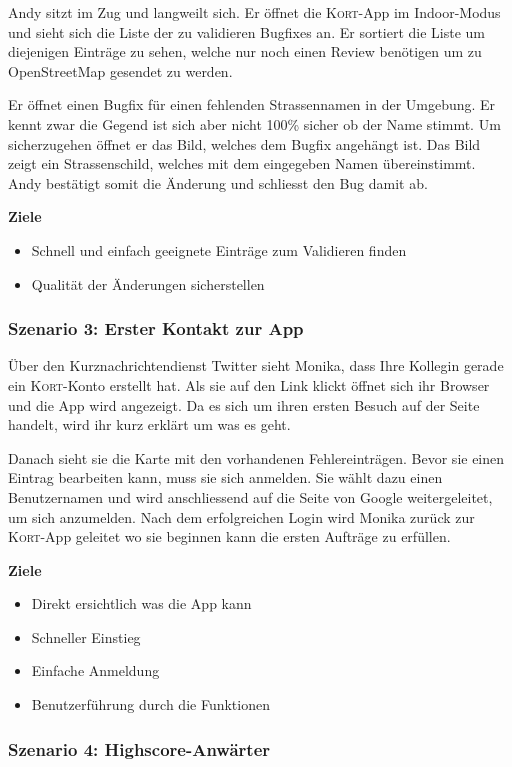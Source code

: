 Andy sitzt im Zug und langweilt sich. Er öffnet die \textsc{Kort}-App im Indoor-Modus und sieht sich die Liste der zu validieren Bugfixes an. Er sortiert die Liste um diejenigen Einträge zu sehen, welche nur noch einen Review benötigen um zu OpenStreetMap gesendet zu werden.

Er öffnet einen Bugfix für einen fehlenden Strassennamen in der Umgebung. Er kennt zwar die Gegend ist sich aber nicht 100\% sicher ob der Name stimmt. Um sicherzugehen öffnet er das Bild, welches dem Bugfix angehängt ist. Das Bild zeigt ein Strassenschild, welches mit dem eingegeben Namen übereinstimmt. Andy bestätigt somit die Änderung und schliesst den Bug damit ab.

\textbf{Ziele}
\begin{itemize}
\item Schnell und einfach geeignete Einträge zum Validieren finden
\item Qualität der Änderungen sicherstellen
\end{itemize}

\subsubsection{Szenario 3: Erster Kontakt zur App}

Über den Kurznachrichtendienst Twitter sieht Monika, dass Ihre Kollegin gerade ein \textsc{Kort}-Konto erstellt hat.
Als sie auf den Link klickt öffnet sich ihr Browser und die App wird angezeigt.
Da es sich um ihren ersten Besuch auf der Seite handelt, wird ihr kurz erklärt um was es geht.

Danach sieht sie die Karte mit den vorhandenen Fehlereinträgen.
Bevor sie einen Eintrag bearbeiten kann, muss sie sich anmelden.
Sie wählt dazu einen Benutzernamen und wird anschliessend auf die Seite von Google weitergeleitet, um sich anzumelden.
Nach dem erfolgreichen Login wird Monika zurück zur \textsc{Kort}-App geleitet wo sie beginnen kann die ersten Aufträge zu erfüllen.

\textbf{Ziele}
\begin{itemize}
\item Direkt ersichtlich was die App kann
\item Schneller Einstieg
\item Einfache Anmeldung
\item Benutzerführung durch die Funktionen
\end{itemize}

\subsubsection{Szenario 4: Highscore-Anwärter}

